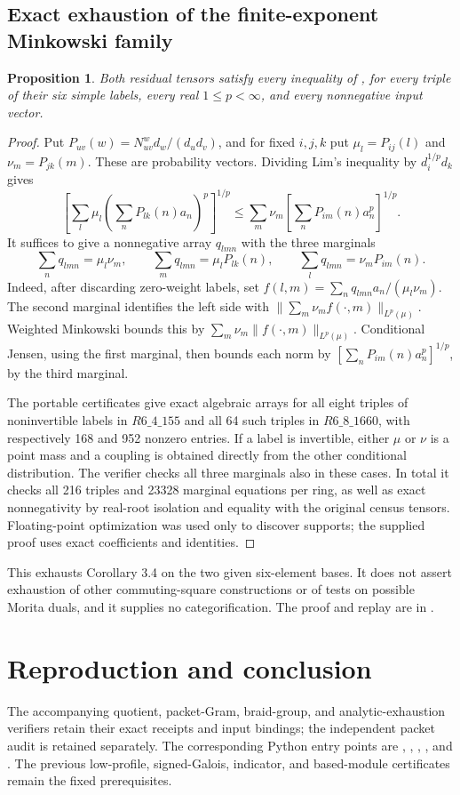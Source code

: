 \documentclass[10pt]{article}
\newtheorem{proposition}[theorem]{Proposition}
\begin{document}
\subsection{Exact exhaustion of the finite-exponent Minkowski family}
\begin{proposition}
Both residual tensors satisfy every inequality of \cite[Corollary 3.4]{Lim}, for every triple of their six simple labels, every real $1\le p<\infty$, and every nonnegative input vector.
\end{proposition}
\begin{proof}
Put $P_{uv}(w)=N_{uv}^{w}d_w/(d_ud_v)$, and for fixed $i,j,k$ put $\mu_l=P_{ij}(l)$ and $\nu_m=P_{jk}(m)$. These are probability vectors. Dividing Lim's inequality by $d_i^{1/p}d_k$ gives
\[
 \left[\sum_l\mu_l\left(\sum_nP_{lk}(n)a_n\right)^p\right]^{1/p}
 \le \sum_m\nu_m\left[\sum_nP_{im}(n)a_n^p\right]^{1/p}.
\]
It suffices to give a nonnegative array $q_{lmn}$ with the three marginals
\[
 \sum_nq_{lmn}=\mu_l\nu_m,\qquad
 \sum_mq_{lmn}=\mu_lP_{lk}(n),\qquad
 \sum_lq_{lmn}=\nu_mP_{im}(n).
\]
Indeed, after discarding zero-weight labels, set
$f(l,m)=\sum_nq_{lmn}a_n/(\mu_l\nu_m)$.
The second marginal identifies the left side with
$\|\sum_m\nu_mf(\cdot,m)\|_{L^p(\mu)}$.
Weighted Minkowski bounds this by $\sum_m\nu_m\|f(\cdot,m)\|_{L^p(\mu)}$.
Conditional Jensen, using the first marginal, then bounds each norm by
$[\sum_nP_{im}(n)a_n^p]^{1/p}$, by the third marginal.

The portable certificates give exact algebraic arrays for all eight triples of noninvertible labels in $R6\_4\_155$ and all 64 such triples in $R6\_8\_1660$, with respectively 168 and 952 nonzero entries. If a label is invertible, either $\mu$ or $\nu$ is a point mass and a coupling is obtained directly from the other conditional distribution. The verifier checks all three marginals also in these cases. In total it checks all 216 triples and 23328 marginal equations per ring, as well as exact nonnegativity by real-root isolation and equality with the original census tensors. Floating-point optimization was used only to discover supports; the supplied proof uses exact coefficients and identities.
\end{proof}
This exhausts Corollary 3.4 on the two given six-element bases. It does not assert exhaustion of other commuting-square constructions or of tests on possible Morita duals, and it supplies no categorification. The proof and replay are in
.

\section{Reproduction and conclusion}
The accompanying quotient, packet-Gram, braid-group, and analytic-exhaustion verifiers retain their exact receipts and input bindings; the independent packet audit is retained separately. The corresponding Python entry points are , , , , and . The previous low-profile, signed-Galois, indicator, and based-module certificates remain the fixed prerequisites.
\end{document}

